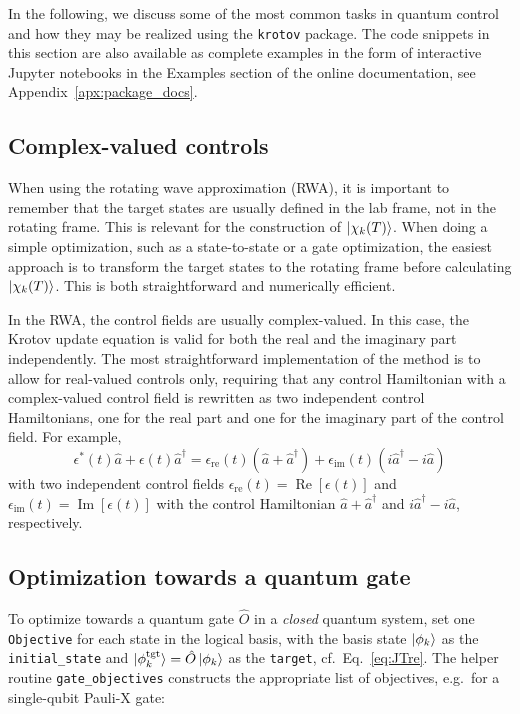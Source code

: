 \documentclass[submission, Phys]{SciPost}
\newcommand{\tgt}[0]{\text{tgt}}
\newcommand{\Op}[1]{\hat{#1}}
\renewcommand{\Re}[0]{\operatorname{Re}}
\renewcommand{\Im}[0]{\operatorname{Im}}
\begin{document}
In the following, we discuss some of the most common tasks in quantum control
and how they may be realized using the \texttt{krotov} package. The code
snippets in this section are also available as complete examples in the form of
interactive Jupyter notebooks in the Examples section of the online
documentation, see Appendix~\ref{apx:package_docs}.

\subsection{Complex-valued controls}%
\label{sec:task_complex_controls}

When using the rotating wave approximation (RWA), it is important to remember
that the target states are usually defined in the lab frame, not in the rotating
frame.
This is relevant for the construction of \(\ket{\chi_k(T)}\). When doing a
simple optimization, such as a state-to-state or a gate optimization, the
easiest approach is to transform the target states to the rotating frame before
calculating \(\ket{\chi_k(T)}\). This is both straightforward and numerically
efficient.

In the RWA, the control fields are usually complex-valued.
In this case, the Krotov update equation is valid for both the real and the
imaginary part independently.
The most straightforward implementation of the method is to allow for
real-valued controls only, requiring that any control Hamiltonian with a
complex-valued control field is rewritten as two independent control
Hamiltonians, one for the real part and one for the imaginary part of the
control field.
For example,
\begin{equation}
  \epsilon^*(t) \Op{a} + \epsilon(t) \Op{a}^\dagger
  =  \epsilon_{\text{re}}(t) (\Op{a} + \Op{a}^\dagger)
    + \epsilon_{\text{im}}(t) (i \Op{a}^\dagger - i \Op{a})
\end{equation}
with two independent control fields \(\epsilon_{\text{re}}(t)=
\Re[\epsilon(t)]\) and \(\epsilon_{\text{im}}(t) = \Im[\epsilon(t)]\) with the
control Hamiltonian $\Op{a} + \Op{a}^\dagger$ and $i \Op{a}^\dagger - i \Op{a}$,
respectively.

\subsection{Optimization towards a quantum gate}%
\label{sec:task_gate_oct}

To optimize towards a quantum gate \(\Op{O}\) in a \emph{closed} quantum system,
set one \texttt{Objective} for each state in the logical basis, with the basis
state \(\ket{\phi_k}\) as the \texttt{initial\_state} and \(\ket{\phi_k^{\tgt}}
= \Op{O} \ket{\phi_k}\) as the \texttt{target}, cf.~Eq.~\eqref{eq:JTre}.
The helper routine \texttt{gate\_objectives} constructs the appropriate list of
objectives, e.g.\ for a single-qubit Pauli-X gate:

\end{document}

